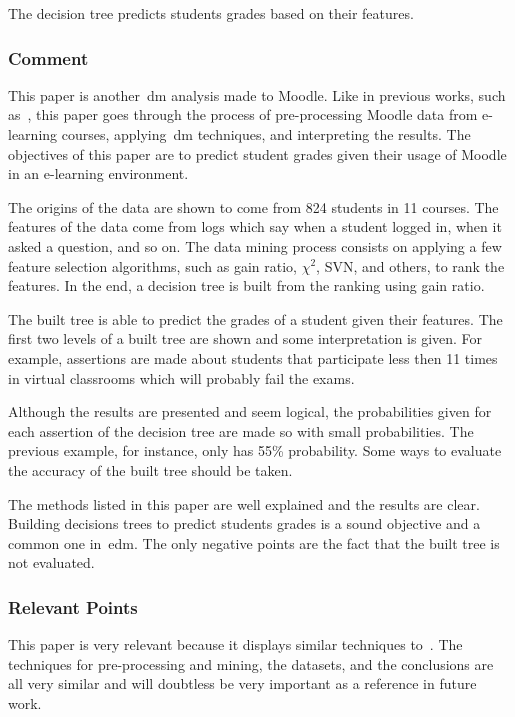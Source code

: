 The decision tree predicts students grades based on their features.

\subsubsection{Comment}

This paper is another~\gls{dm} analysis made to Moodle. Like in previous works,
such as~\cite{ind_002, ind_004}, this paper goes through the process of
pre-processing Moodle data from e-learning courses, applying~\gls{dm}
techniques, and interpreting the results. The objectives of this paper are to
predict student grades given their usage of Moodle in an e-learning
environment.

The origins of the data are shown to come from 824 students in 11 courses. The
features of the data come from logs which say when a student logged in, when it
asked a question, and so on. The data mining process consists on applying a few
feature selection algorithms, such as gain ratio, $ \chi^2 $, SVN, and others,
to rank the features. In the end, a decision tree is built from the ranking
using gain ratio.

The built tree is able to predict the grades of a student given their features.
The first two levels of a built tree are shown and some interpretation is
given. For example, assertions are made about students that participate less
then 11 times in virtual classrooms which will probably fail the exams.

Although the results are presented and seem logical, the probabilities given
for each assertion of the decision tree are made so with small probabilities.
The previous example, for instance, only has 55\% probability. Some ways to
evaluate the accuracy of the built tree should be taken.

The methods listed in this paper are well explained and the results are clear.
Building decisions trees to predict students grades is a sound objective and a
common one in~\gls{edm}. The only negative points are the fact that the built
tree is not evaluated.

\subsubsection{Relevant Points}

This paper is very relevant because it displays similar techniques
to~\cite{ind_002, ind_004}. The techniques for pre-processing and mining, the
datasets, and the conclusions are all very similar and will doubtless be very
important as a reference in future work.

